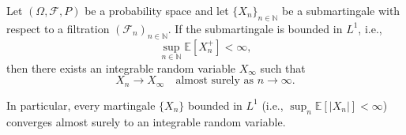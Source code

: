 \begin{theorem} \label{theorem:martingale_convergence_theorem}
Let $(\Omega, \mathcal{F}, P)$ be a probability space and let $\{X_n\}_{n \in \mathbb{N}}$ be a submartingale with respect to a filtration $(\mathcal{F}_n)_{n \in \mathbb{N}}$. If the submartingale is bounded in $L^1$, i.e.,
$$\sup_{n \in \mathbb{N}} \mathbb{E}[X_n^+] < \infty,$$
then there exists an integrable random variable $X_\infty$ such that
$$X_n \to X_\infty \quad \text{almost surely as } n \to \infty.$$

In particular, every martingale $\{X_n\}$ bounded in $L^1$ (i.e., $\sup_{n} \mathbb{E}[|X_n|] < \infty$) converges almost surely to an integrable random variable.
\end{theorem}

